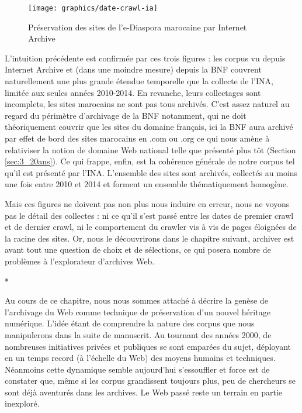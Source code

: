 \documentclass[symmetric,justified,marginals=raggedouter]{tufte-book}
\begin{document}
\begin{figure}[hbtp]%
  \texttt{[image: graphics/date-crawl-ia]}
  \caption{Préservation des sites de l'e-Diaspora marocaine par Internet Archive}
  \label{fig:date-crawl-ia}
\end{figure}

\fi

L'intuition précédente est confirmée par ces trois figures : les corpus vu depuis Internet Archive et (dans une moindre mesure) depuis la BNF couvrent naturellement une plus grande étendue temporelle que la collecte de l'INA, limitée aux seules années 2010-2014. En revanche, leurs collectages sont incomplets, les sites marocains ne sont pas tous archivés. C'est assez naturel au regard du périmètre d'archivage de la BNF notamment, qui ne doit théoriquement couvrir que les sites du domaine français, ici la BNF aura archivé par effet de bord des sites marocains en .com ou .org ce qui nous amène à relativiser la notion de domaine Web national telle que présenté plus tôt (Section \ref{sec:3_20ans}). Ce qui frappe, enfin, est la cohérence générale de notre corpus tel qu'il est présenté par l'INA. L'ensemble des sites sont archivés, collectés au moins une fois entre 2010 et 2014 et forment un ensemble thématiquement homogène. 

Mais ces figures ne doivent pas non plus nous induire en erreur, nous ne voyons pas le détail des collectes : ni ce qu'il s'est passé entre les dates de premier crawl et de dernier crawl, ni le comportement du crawler vis à vis de pages éloignées de la racine des sites. Or, nous le découvrirons dans le chapitre suivant, archiver est avant tout une question de choix et de sélections, ce qui posera nombre de problèmes à l'explorateur d'archives Web. 

\begin{center}
	*
\end{center}

\noindent Au cours de ce chapitre, nous nous sommes attaché à décrire la genèse de l'archivage du Web comme technique de préservation d'un nouvel héritage numérique. L'idée étant de comprendre la nature des corpus que nous manipulerons dans la suite de manuscrit. Au tournant des années 2000, de nombreuses initiatives privées et publiques se sont emparées du sujet, déployant en un temps record (à l'échelle du Web) des moyens humains et techniques. Néanmoins cette dynamique semble aujourd'hui s'essouffler et force est de constater que, même si les corpus grandissent toujours plus, peu de chercheurs se sont déjà aventurés dans les archives. Le Web passé reste un terrain en partie inexploré. 
\end{document}
